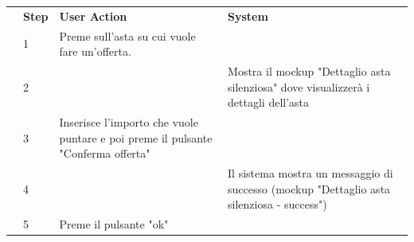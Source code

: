 \begin{table}[H]
\begin{tabularx}{\linewidth}{|p{135pt}|p{25pt}|>{\raggedright\arraybackslash}X|>{\raggedright\arraybackslash}X|}
		\hline \rowcolor[HTML]{DCDCDC}
		\multirow{1}{*}{}{\textbf{\sffamily Description}}                                & \textbf{\sffamily Step}                                                                                                                                                & \textbf{\sffamily User Action}                                                   & \textbf{\sffamily System}                                                                      \\
		\cline{2-4}                                                                      & 1                                                                                                                                                                      & Preme sull'asta su cui vuole fare un'offerta.                                    &                                                                                                \\
		\cline{2-4}                                                                      & 2                                                                                                                                                                      &                                                                                  & Mostra il mockup "Dettaglio asta silenziosa" dove visualizzerà i dettagli dell'asta            \\
		\cline{2-4}                                                                      & 3                                                                                                                                                                      & Inserisce l'importo che vuole puntare e poi preme il pulsante "Conferma offerta" &                                                                                                \\
		\cline{2-4}                                                                      & 4                                                                                                                                                                      &                                                                                  & Il sistema mostra un messaggio di successo (mockup "Dettaglio asta silenziosa - success")      \\
		\cline{2-4}                                                                      & 5                                                                                                                                                                      & Preme il pulsante "ok"                                                           &                                                                                                \\

\end{tabularx}
\end{table}
